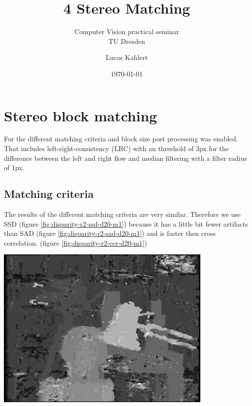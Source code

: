 \documentclass[a4paper]{scrartcl}
\title{4 Stereo Matching}
\subtitle{Computer Vision practical seminar \\ TU Dresden}
\author{Lucas Kahlert}
\date{\today}
\begin{document}
\maketitle

\section{Stereo block matching}

For the different matching criteria and block size post processing was
enabled. That includes left-right-consistency (LRC) with an threshold of 3px
for the difference between the left and right flow and median filtering with a
filter radius of 1px.



\subsection{Matching criteria}

The results of the different matching criteria are very similar. Therefore we
use SSD (figure \ref{fig:disparity-r2-ssd-d20-m1}) because it has a little bit fewer artifacts than SAD (figure \ref{fig:disparity-r2-sad-d20-m1}) and is faster
then cross correlation. (figure \ref{fig:disparity-r2-ccr-d20-m1})

\vspace{1cm}
\begin{minipage}{0.8\textwidth}
  \centering
  \includegraphics[width=0.8\textwidth]{images/disparity-r1-ssd-d20-m1.png}
  \label{fig:disparity-r2-ssd-d20-m1}
\end{minipage}
\end{document}
